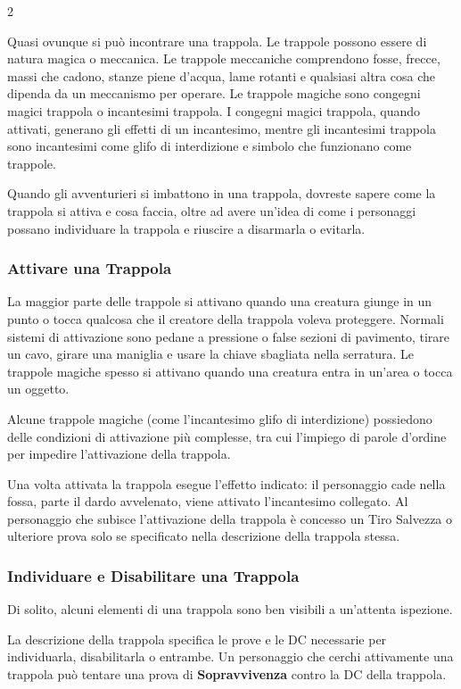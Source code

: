 \begin{multicols}{2}

Quasi ovunque si può incontrare una trappola. Le trappole possono essere di natura magica o meccanica. Le trappole meccaniche comprendono fosse, frecce, massi che cadono, stanze piene d'acqua, lame rotanti e qualsiasi altra cosa che dipenda da un meccanismo per operare. Le trappole magiche sono congegni magici trappola o incantesimi trappola. I congegni magici trappola, quando attivati, generano gli effetti di un incantesimo, mentre gli incantesimi trappola sono incantesimi come glifo di interdizione e simbolo che funzionano come trappole.

Quando gli avventurieri si imbattono in una trappola, dovreste sapere come la trappola si attiva e cosa faccia, oltre ad avere un'idea di come i personaggi possano individuare la trappola e riuscire a disarmarla o evitarla.

\subsubsection{Attivare una Trappola}
La maggior parte delle trappole si attivano quando una creatura giunge in un punto o tocca qualcosa che il creatore della trappola voleva proteggere. Normali sistemi di attivazione sono pedane a pressione o false sezioni di pavimento, tirare un cavo, girare una maniglia e usare la chiave sbagliata nella serratura. Le trappole magiche spesso si attivano quando una creatura entra in un'area o tocca un oggetto.

Alcune trappole magiche (come l'incantesimo glifo di interdizione) possiedono delle condizioni di attivazione più complesse, tra cui l'impiego di parole d'ordine per impedire l'attivazione della trappola.

Una volta attivata la trappola esegue l'effetto indicato: il personaggio cade nella fossa, parte il dardo avvelenato, viene attivato l'incantesimo collegato. Al personaggio che subisce l'attivazione della trappola è concesso un Tiro Salvezza o ulteriore prova solo se specificato nella descrizione della trappola stessa.

\subsubsection{Individuare e Disabilitare una Trappola}
Di solito, alcuni elementi di una trappola sono ben visibili a un'attenta ispezione.

La descrizione della trappola specifica le prove e le DC necessarie per individuarla, disabilitarla o entrambe. Un personaggio che cerchi attivamente una trappola può tentare una prova di \textbf{Sopravvivenza} contro la DC della trappola.


\end{multicols}
